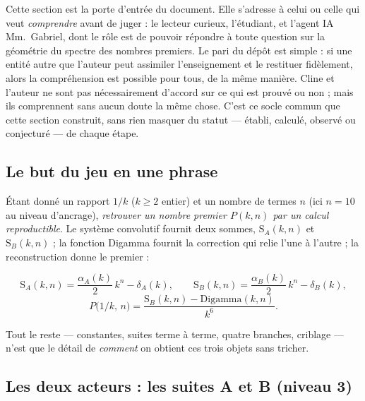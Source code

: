 \documentclass[11pt,a4paper]{article}
\newcommand{\SA}{\mathrm{S}_A}
\newcommand{\SB}{\mathrm{S}_B}
\begin{document}
\vspace{0.3cm}
\begin{boitenote}
Cette section est la porte d'entrée du document. Elle s'adresse à celui
ou celle qui veut \emph{comprendre} avant de juger : le lecteur curieux,
l'étudiant, et l'agent IA Mm.~Gabriel, dont le rôle est de pouvoir
répondre à toute question sur la géométrie du spectre des nombres
premiers. Le pari du dépôt est simple : si une entité autre que
l'auteur peut assimiler l'enseignement et le restituer fidèlement, alors
la compréhension est possible pour tous, de la même manière. Cline et
l'auteur ne sont pas nécessairement d'accord sur ce qui est prouvé ou
non ; mais ils comprennent sans aucun doute la même chose. C'est ce socle
commun que cette section construit, sans rien masquer du statut
--- établi, calculé, observé ou conjecturé --- de chaque étape.
\end{boitenote}


\subsection{Le but du jeu en une phrase}

Étant donné un rapport $1/k$ ($k \ge 2$ entier) et un nombre de termes
$n$ (ici $n = 10$ au niveau d'ancrage), \emph{retrouver un nombre premier
$P(k,n)$ par un calcul reproductible}. Le système convolutif fournit deux
sommes, $\SA(k,n)$ et $\SB(k,n)$ ; la fonction Digamma fournit la correction
qui relie l'une à l'autre ; la reconstruction donne le premier :
\vspace{0.3cm}
\begin{boiteformule}
\[
\SA(k,n) = \frac{\alpha_A(k)}{2}\,k^{n} - \delta_A(k),
\qquad
\SB(k,n) = \frac{\alpha_B(k)}{2}\,k^{n} - \delta_B(k),
\]
\[
P\bigl(1/k,\,n\bigr) = \frac{\SB(k,n) - \mathrm{Digamma}(k,n)}{k^{6}}.
\]
\end{boiteformule}
Tout le reste --- constantes, suites terme à terme, quatre branches,
criblage --- n'est que le détail de \emph{comment} on obtient ces trois
objets sans tricher.

\subsection{Les deux acteurs : les suites A et B (niveau 3)}
\end{document}
